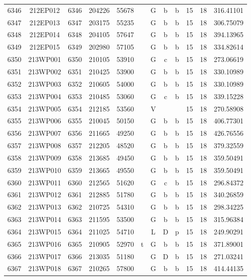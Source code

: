 \begin{tabular}{|*{12}{c|}}
6346 & 212EP012 & 6346 & 204226 & 55678 &  & G & b & b & 15 & 18 & 316.41101 \\ 
6347 & 212EP013 & 6347 & 203175 & 55235 &  & G & b & b & 15 & 18 & 306.75079 \\ 
6348 & 212EP014 & 6348 & 204105 & 57647 &  & G & b & b & 15 & 18 & 394.13965 \\ 
6349 & 212EP015 & 6349 & 202980 & 57105 &  & G & b & b & 15 & 18 & 334.82614 \\ 
6350 & 213WP001 & 6350 & 210105 & 53910 &  & G & c & b & 15 & 18 & 273.06619 \\ 
6351 & 213WP002 & 6351 & 210425 & 53900 &  & G & b & b & 15 & 18 & 330.10989 \\ 
6352 & 213WP003 & 6352 & 210605 & 54000 &  & G & b & b & 15 & 18 & 330.10989 \\ 
6353 & 213WP004 & 6353 & 210485 & 53060 &  & G & c & b & 15 & 18 & 339.15228 \\ 
6354 & 213WP005 & 6354 & 212185 & 53560 &  & V &  &  & 15 & 18 & 270.58908 \\ 
6355 & 213WP006 & 6355 & 210045 & 50150 &  & G & b & b & 15 & 18 & 406.77301 \\ 
6356 & 213WP007 & 6356 & 211665 & 49250 &  & G & b & b & 15 & 18 & 426.76556 \\ 
6357 & 213WP008 & 6357 & 212205 & 48520 &  & G & b & b & 15 & 18 & 379.32559 \\ 
6358 & 213WP009 & 6358 & 213685 & 49450 &  & G & b & b & 15 & 18 & 359.50491 \\ 
6359 & 213WP010 & 6359 & 213665 & 49550 &  & G & b & b & 15 & 18 & 359.50491 \\ 
6360 & 213WP011 & 6360 & 212565 & 51620 &  & G & c & b & 15 & 18 & 296.84372 \\ 
6361 & 213WP012 & 6361 & 212885 & 51780 &  & G & b & b & 15 & 18 & 340.26859 \\ 
6362 & 213WP013 & 6362 & 210725 & 54310 &  & G & b & b & 15 & 18 & 298.34225 \\ 
6363 & 213WP014 & 6363 & 211595 & 53500 &  & G & b & b & 15 & 18 & 315.96384 \\ 
6364 & 213WP015 & 6364 & 211025 & 54710 &  & L & D & p & 15 & 18 & 249.90291 \\ 
6365 & 213WP016 & 6365 & 210905 & 52970 & t & G & b & b & 15 & 18 & 371.89001 \\ 
6366 & 213WP017 & 6366 & 213035 & 51180 &  & G & D & b & 15 & 18 & 271.03241 \\ 
6367 & 213WP018 & 6367 & 210265 & 57800 &  & G & b & b & 15 & 18 & 414.44135 \\ 

\end{tabular}
